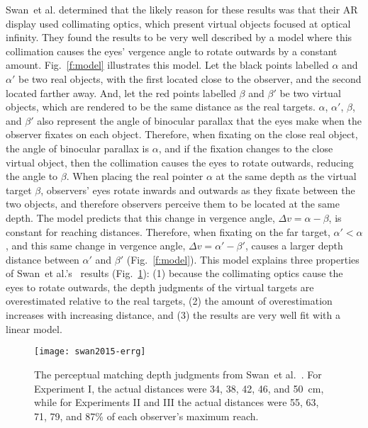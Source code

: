 \documentclass[10pt,journal,compsoc]{IEEEtran}
\makeatletter
\newlength{\FigWidth}
\newcommand{\etal}{et al.\@\xspace} %
\makeatother
\begin{document}
Swan~\etal\cite{swan:2015} determined that the likely reason for these results was that their AR display used collimating optics, which present virtual objects focused at optical infinity.  They found the results to be very well described by a model where this collimation causes the eyes' vergence angle to rotate outwards by a constant amount.  Fig.~\ref{f:model} illustrates this model.  Let the black points labelled $\alpha$ and $\alpha'$ be two real objects, with the first located close to the observer, and the second located farther away.  And, let the red points labelled $\beta$ and $\beta'$ be two virtual objects, which are rendered to be the same distance as the real targets.  $\alpha$, $\alpha'$, $\beta$, and $\beta'$ also represent the angle of binocular parallax that the eyes make when the observer fixates on each object.  
Therefore, when fixating on the close real object, the angle of binocular parallax is $\alpha$, and if the fixation changes to the close virtual object, then the collimation causes the eyes to rotate outwards, reducing the angle to $\beta$. 
When placing the real pointer $\alpha$ at the same depth as the virtual target $\beta$, observers' eyes rotate inwards and outwards as they fixate between the two objects, and therefore observers perceive them to be located at the same depth.  
The model predicts that this change in vergence angle, $\Delta v = \alpha - \beta$, is constant for reaching distances.  Therefore, when fixating on the far target, $\alpha' < \alpha$, and this same change in vergence angle, $\Delta v = \alpha' - \beta'$, causes a larger depth distance between $\alpha'$ and $\beta'$ (Fig.~\ref{f:model}).  
This model explains three properties of Swan~\etal's~\cite{swan:2015} results (Fig.~\ref{f:swan2015}): (1) because the collimating optics cause the eyes to rotate outwards, the depth judgments of the virtual targets are overestimated relative to the real targets, (2) the amount of overestimation increases with increasing distance, and (3) the results are very well fit with a linear model.   

\begin{figure}[!t]
\centering
\texttt{[image: swan2015-errg]}
\caption{The perceptual matching depth judgments from Swan~\etal~\cite{swan:2015}.  For Experiment I, the actual distances were 34, 38, 42, 46, and 50~cm, while for Experiments II and III the actual distances were 55, 63, 71, 79, and 87\% of each observer's maximum reach.}
\label{f:swan2015}
\end{figure}
\end{document}
